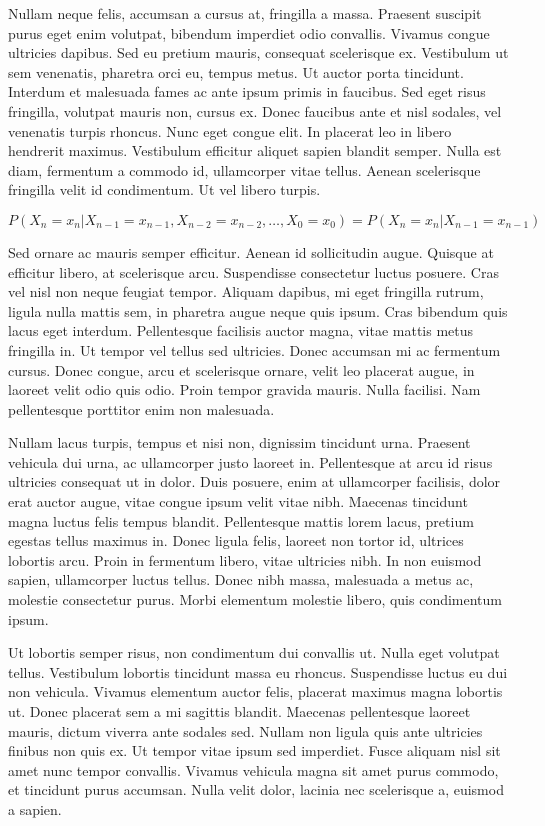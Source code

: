 \documentclass[thesismargins, thesislinespacing, twoside, openright, upjsfrontpage]{rnthesis}
\begin{document}
Nullam neque felis, accumsan a cursus at, fringilla a massa. Praesent suscipit purus eget enim volutpat, bibendum imperdiet odio convallis. Vivamus congue ultricies dapibus. Sed eu pretium mauris, consequat scelerisque ex. Vestibulum ut sem venenatis, pharetra orci eu, tempus metus. Ut auctor porta tincidunt. Interdum et malesuada fames ac ante ipsum primis in faucibus. Sed eget risus fringilla, volutpat mauris non, cursus ex. Donec faucibus ante et nisl sodales, vel venenatis turpis rhoncus. Nunc eget congue elit. In placerat leo in libero hendrerit maximus. Vestibulum efficitur aliquet sapien blandit semper. Nulla est diam, fermentum a commodo id, ullamcorper vitae tellus. Aenean scelerisque fringilla velit id condimentum. Ut vel libero turpis.

\begin{equation}
P(X_n = x_n | X_{n - 1} = x_{n - 1}, X_{n - 2} = x_{n - 2}, \dots, X_0 = x_0) = P(X_n = x_n | X_{n - 1} = x_{n - 1})
\end{equation}

Sed ornare ac mauris semper efficitur. Aenean id sollicitudin augue. Quisque at efficitur libero, at scelerisque arcu. Suspendisse consectetur luctus posuere. Cras vel nisl non neque feugiat tempor. Aliquam dapibus, mi eget fringilla rutrum, ligula nulla mattis sem, in pharetra augue neque quis ipsum. Cras bibendum quis lacus eget interdum. Pellentesque facilisis auctor magna, vitae mattis metus fringilla in. Ut tempor vel tellus sed ultricies. Donec accumsan mi ac fermentum cursus. Donec congue, arcu et scelerisque ornare, velit leo placerat augue, in laoreet velit odio quis odio. Proin tempor gravida mauris. Nulla facilisi. Nam pellentesque porttitor enim non malesuada.

Nullam lacus turpis, tempus et nisi non, dignissim tincidunt urna. Praesent vehicula dui urna, ac ullamcorper justo laoreet in. Pellentesque at arcu id risus ultricies consequat ut in dolor. Duis posuere, enim at ullamcorper facilisis, dolor erat auctor augue, vitae congue ipsum velit vitae nibh. Maecenas tincidunt magna luctus felis tempus blandit. Pellentesque mattis lorem lacus, pretium egestas tellus maximus in. Donec ligula felis, laoreet non tortor id, ultrices lobortis arcu. Proin in fermentum libero, vitae ultricies nibh. In non euismod sapien, ullamcorper luctus tellus. Donec nibh massa, malesuada a metus ac, molestie consectetur purus. Morbi elementum molestie libero, quis condimentum ipsum.

Ut lobortis semper risus, non condimentum dui convallis ut. Nulla eget volutpat tellus. Vestibulum lobortis tincidunt massa eu rhoncus. Suspendisse luctus eu dui non vehicula. Vivamus elementum auctor felis, placerat maximus magna lobortis ut. Donec placerat sem a mi sagittis blandit. Maecenas pellentesque laoreet mauris, dictum viverra ante sodales sed. Nullam non ligula quis ante ultricies finibus non quis ex. Ut tempor vitae ipsum sed imperdiet. Fusce aliquam nisl sit amet nunc tempor convallis. Vivamus vehicula magna sit amet purus commodo, et tincidunt purus accumsan. Nulla velit dolor, lacinia nec scelerisque a, euismod a sapien. 
\end{document}
